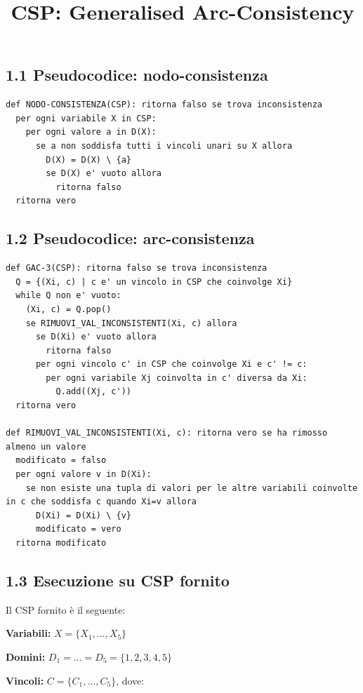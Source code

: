 \documentclass[a4paper,11pt]{article}
\title{CSP: Generalised Arc-Consistency}
\date{}
\begin{document}
\maketitle

\subsection*{1.1 Pseudocodice: nodo-consistenza}

\begin{lstlisting}
def NODO-CONSISTENZA(CSP): ritorna falso se trova inconsistenza
  per ogni variabile X in CSP:
    per ogni valore a in D(X):
      se a non soddisfa tutti i vincoli unari su X allora
        D(X) = D(X) \ {a}
        se D(X) e' vuoto allora
          ritorna falso
  ritorna vero
\end{lstlisting}


\subsection*{1.2 Pseudocodice: arc-consistenza}
\begin{lstlisting}
def GAC-3(CSP): ritorna falso se trova inconsistenza
  Q = {(Xi, c) | c e' un vincolo in CSP che coinvolge Xi}
  while Q non e' vuoto:
    (Xi, c) = Q.pop()
    se RIMUOVI_VAL_INCONSISTENTI(Xi, c) allora
      se D(Xi) e' vuoto allora
        ritorna falso
      per ogni vincolo c' in CSP che coinvolge Xi e c' != c:
        per ogni variabile Xj coinvolta in c' diversa da Xi:
          Q.add((Xj, c'))
  ritorna vero

def RIMUOVI_VAL_INCONSISTENTI(Xi, c): ritorna vero se ha rimosso almeno un valore
  modificato = falso
  per ogni valore v in D(Xi):
    se non esiste una tupla di valori per le altre variabili coinvolte in c che soddisfa c quando Xi=v allora
      D(Xi) = D(Xi) \ {v}
      modificato = vero
  ritorna modificato
\end{lstlisting}

\newpage

\subsection*{1.3 Esecuzione su CSP fornito}

Il CSP fornito è il seguente:

\textbf{Variabili:} $X = \{X_1, \dots,  X_5\}$


\textbf{Domini:} $D_1 = \dots = D_5 = \{1, 2, 3, 4, 5\}$


\textbf{Vincoli:} $C = \{C_1, \dots, C_5\}$, dove:
\end{document}
